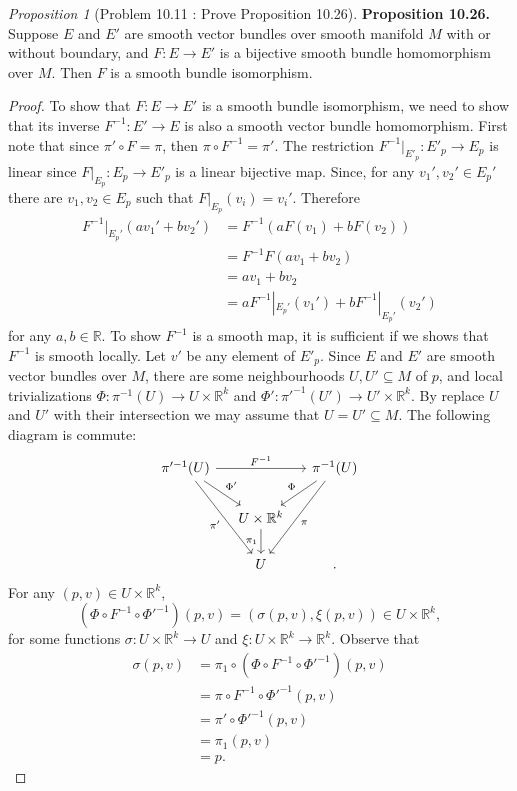 \documentclass[a4paper]{article}
\theoremstyle{remark}
\newtheorem{prop}{Proposition}
\newcommand{\er}{\mathbb{R}} %
\newcommand{\rk}{\mathbb{R}^k} %
\newcommand{\subhim}{\subseteq} %
\begin{document}
\begin{prop}[Problem 10.11 : Prove Proposition 10.26]
\textbf{Proposition 10.26. } Suppose $E$ and $E'$ are smooth vector bundles over smooth manifold $M$ with or without boundary, and $F : E \to E'$ is a bijective smooth bundle homomorphism over $M$. Then $F$ is a smooth bundle isomorphism.
\end{prop}
\begin{proof}
To show that $F : E \to E'$ is a smooth bundle isomorphism, we need to show that its inverse $F^{-1} : E'\to E$ is also a smooth vector bundle homomorphism. First note that since $\pi' \circ F = \pi$, then $\pi \circ F^{-1} = \pi'$. The restriction $F^{-1}|_{E'_p} : E'_p \to E_p$ is linear since $F|_{E_p} : E_p \to E'_p$ is a linear bijective map. Since, for any $v_1',v_2' \in E_p'$ there are $v_1,v_2 \in E_p$ such that $F|_{E_p} (v_i) = v_i'$. Therefore
\begin{align*}
F^{-1}|_{E_p'} (av_1'+bv_2')&= F^{-1} (aF(v_1) + bF(v_2))\\ &= F^{-1}F(av_1+bv_2) \\ &= av_1 +b v_2 \\ &= aF^{-1}|_{E_p'}(v_1') + b F^{-1}|_{E_p'}(v_2')
\end{align*}
for any $a,b \in \er$. To show $F^{-1}$ is a smooth map, it is sufficient if we shows that $F^{-1}$ is smooth locally. Let $v'$ be any element of $E'_p$. Since $E$ and $E'$ are smooth vector bundles over $M$, there are some neighbourhoods $U,U'\subhim M$ of $p$, and local trivializations $\Phi : \pi^{-1}(U) \to U \times \rk$ and $\Phi' : \pi'^{-1}(U') \to U' \times \rk$. By replace $U$ and $U'$ with their intersection we may assume that  $U=U' \subhim M$. The following diagram is commute:
\[
\begin{tikzcd}[column sep=small]
\pi'^{-1}(U) \arrow[rr,"F^{-1}"] \arrow[dr,"\Phi'"] \arrow[ddr,"\pi'",swap] & & \pi^{-1}(U) \arrow[dl,"\Phi",swap] \arrow[ddl,"\pi"]  \\
& U \times \rk \arrow[d,"\pi_1",swap] & \\
&U&.
\end{tikzcd}
\]
For any $(p,v) \in U \times \rk$,
$$
(\Phi \circ F^{-1} \circ \Phi'^{-1}) (p,v) = (\sigma(p,v), \xi(p,v)) \in U \times \rk,
$$
for some functions $\sigma : U \times \rk \to U$ and $\xi : U \times \rk \to \rk$. Observe that
\begin{align*}
\sigma(p,v) &= \pi_1 \circ (\Phi \circ F^{-1} \circ \Phi'^{-1}) (p,v)\\ &= \pi \circ F^{-1} \circ \Phi'^{-1} (p,v) \\ &= \pi' \circ \Phi'^{-1} (p,v) \\ &= \pi_1 (p,v) \\ &= p.

\end{align*}
\end{proof}
\end{document}
